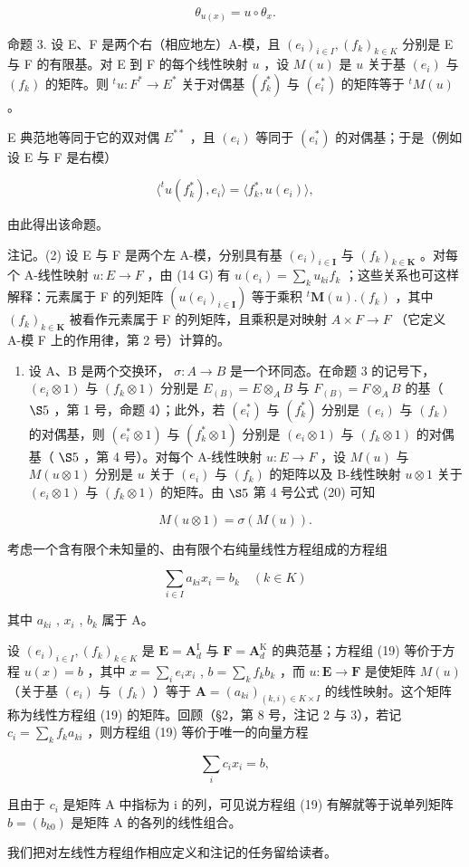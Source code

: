 \[
\theta_ {u (x)} = u \circ \theta_ {x}.
\]

命题 3. 设 E、F 是两个右（相应地左）A-模，且 \((e_i)_{i\in I}, (f_k)_{k\in K}\) 分别是 E 与 F 的有限基。对 E 到 F 的每个线性映射 \(u\) ，设 \(M(u)\) 是 \(u\) 关于基 \((e_i)\) 与 \((f_k)\) 的矩阵。则 \(^t u: F^* \to E^*\) 关于对偶基 \((f_k^*)\) 与 \((e_i^*)\) 的矩阵等于 \(^t M(u)\) 。

E 典范地等同于它的双对偶 \(E^{**}\) ，且 \((e_{i})\) 等同于 \((e_{i}^{*})\) 的对偶基；于是（例如设 E 与 F 是右模）

\[
\langle^ {t} u (f _ {k} ^ {*}), e _ {i} \rangle = \langle f _ {k} ^ {*}, u (e _ {i}) \rangle ,
\]

由此得出该命题。

注记。(2) 设 E 与 F 是两个左 A-模，分别具有基 \((e_{i})_{i\in\mathbf{I}}\) 与 \((f_{k})_{k\in\mathbf{K}}\) 。对每个 A-线性映射 \(u:E\to F\) ，由 (14 G) 有 \(u(e_{i})=\sum_{k}u_{ki}f_{k}\) ；这些关系也可这样解释：元素属于 F 的列矩阵 \((u(e_{i})_{i\in\mathbf{I}})\) 等于乘积 \({}^{t}\mathbf{M}(u).(f_{k})\) ，其中 \((f_{k})_{k\in\mathbf{K}}\) 被看作元素属于 F 的列矩阵，且乘积是对映射 \(A\times F\to F\) （它定义 A-模 F 上的作用律，第 2 号）计算的。

\begin{enumerate}
\def\labelenumi{(\arabic{enumi})}
\setcounter{enumi}{2}
\tightlist
\item
设 A、B 是两个交换环， \(\sigma: A \to B\) 是一个环同态。在命题 3 的记号下， \((e_i \otimes 1)\) 与 \((f_k \otimes 1)\) 分别是 \(E_{(B)} = E \otimes_A B\) 与 \(F_{(B)} = F \otimes_A B\) 的基（ \(\S 5\) ，第 1 号，命题 4）；此外，若 \((e_i^*)\) 与 \((f_k^*)\) 分别是 \((e_i)\) 与 \((f_k)\) 的对偶基，则 \((e_i^* \otimes 1)\) 与 \((f_k^* \otimes 1)\) 分别是 \((e_i \otimes 1)\) 与 \((f_k \otimes 1)\) 的对偶基（ \(\S 5\) ，第 4 号）。对每个 A-线性映射 \(u: E \to F\) ，设 \(M(u)\) 与 \(M(u \otimes 1)\) 分别是 \(u\) 关于 \((e_i)\) 与 \((f_k)\) 的矩阵以及 B-线性映射 \(u \otimes 1\) 关于 \((e_i \otimes 1)\) 与 \((f_k \otimes 1)\) 的矩阵。由 \(\S 5\) 第 4 号公式 (20) 可知
\end{enumerate}

\[
M (u \otimes 1) = \sigma (M (u)).
\]

考虑一个含有限个未知量的、由有限个右纯量线性方程组成的方程组

\[
\sum_ {i \in I} a _ {k i} x _ {i} = b _ {k} \quad (k \in K)\tag{19}
\]

其中 \(a_{ki}\) , \(x_{i}\) , \(b_{k}\) 属于 A。

设 \((e_i)_{i\in I}, (f_k)_{k\in K}\) 是 \(\mathbf{E} = \mathbf{A}_d^{\mathrm{I}}\) 与 \(\mathbf{F} = \mathbf{A}_d^{\mathrm{K}}\) 的典范基；方程组 (19) 等价于方程 \(u(x) = b\) ，其中 \(x = \sum_{i} e_i x_i\) , \(b = \sum_{k} f_k b_k\) ，而 \(u: \mathbf{E} \to \mathbf{F}\) 是使矩阵 \(M(u)\) （关于基 \((e_i)\) 与 \((f_k)\) ）等于 \(\mathbf{A} = (a_{ki})_{(k,i)\in K\times I}\) 的线性映射。这个矩阵称为线性方程组 (19) 的矩阵。回顾（§2，第 8 号，注记 2 与 3），若记 \(c_i = \sum_{k} f_k a_{ki}\) ，则方程组 (19) 等价于唯一的向量方程

\[
\sum_ {i} c _ {i} x _ {i} = b,\tag{20}
\]

且由于 \(c_{i}\) 是矩阵 A 中指标为 i 的列，可见说方程组 (19) 有解就等于说单列矩阵 \(b = (b_{k0})\) 是矩阵 A 的各列的线性组合。

我们把对左线性方程组作相应定义和注记的任务留给读者。


